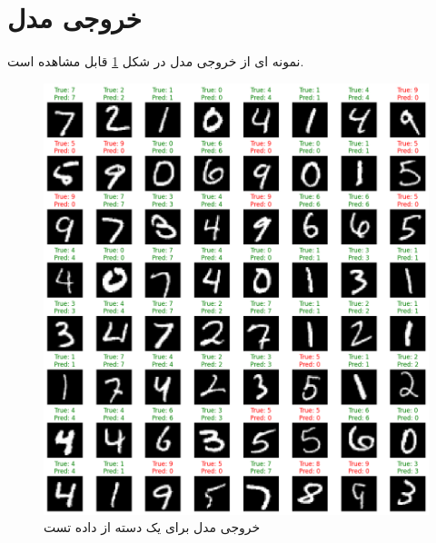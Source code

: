 \documentclass[11pt]{article}
\begin{document}
	 \section{خروجی مدل}
	 نمونه ای از خروجی مدل در شکل
	 \ref{fig: preds}
	  قابل مشاهده است.
	 \begin{figure}[H]
	 	\centering
	 	\includegraphics[scale=0.4]{figs/pred}
	 	\caption{خروجی مدل برای یک دسته از داده تست}
	 	\label{fig: preds}
	 \end{figure}
\end{document}
